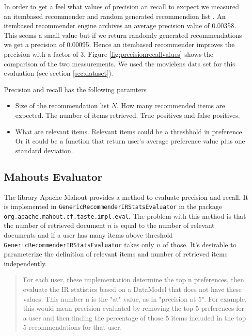 In order to get a feel what values of precision an recall to excpect we measured an itembased recommender and random generated recommendion list \cite{jannach11}.
An itembased recommender engine archives an average precision value of 0.00358. This seems a small value but if we return randomly generated recommendations we get a precision of 0.00095. Hence an itembased recommender improves the precision with a factor of 3. Figure \ref{fig:precisionrecallvalues} shows the comparison of the two measurements. We used the movielens data set for this evaluation (see section \ref{sec:dataset}).

Precision and recall has the following paramters
\begin{itemize}
\item Size of the recommendation list $N$. How many recommended items are expected. The number of items retrieved. True positives and false positives.
\item What are relevant items. Relevant items could be a threshhold in preference. Or it could be a function that return user's average preference value plus one standard deviation.
\end{itemize}

\subsection{Mahouts Evaluator}
\label{sec:mahouteval}

The library Apache Mahout provides a method to evaluate precision and recall. It is implemented in 
 \verb|GenericRecommenderIRStatsEvaluator| in the package \verb|org.apache.mahout.cf.taste.impl.eval|. The problem with this method is that the number of retrieved document $n$ is equal to the number of relevant documents and if a user has many items above threshold  \verb|GenericRecommenderIRStatsEvaluator| takes only $n$ of those. It's desirable to parameterize the definition of relevant items and number of retrieved items independently.

\begin{quote}
For each user, these implementation determine the top n preferences, then evaluate the IR statistics based on a DataModel that does not have these values. This number n is the "at" value, as in "precision at 5". For example, this would mean precision evaluated by removing the top 5 preferences for a user and then finding the percentage of those 5 items included in the top 5 recommendations for that user. 
\end{quote}

